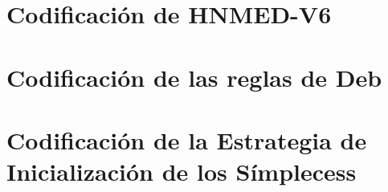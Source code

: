 \section{Codificación de HNMED-V6 }

\section{Codificación de las reglas de Deb}\label{sec:Debs rules}

\section{Codificación de la Estrategia de Inicialización de los Símplecess}

